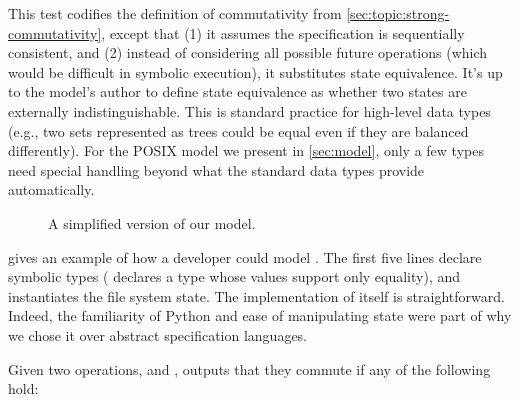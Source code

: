 This test codifies the definition of \SIM commutativity from
\cref{sec:topic:strong-commutativity},
except that (1) it assumes the specification is sequentially consistent,
and (2) instead of considering all possible future operations
(which would be difficult in symbolic execution), it substitutes state
equivalence.  It's up to the model's author to define state equivalence
as whether two states are externally indistinguishable.  This is
standard practice for high-level data types (e.g., two sets represented
as trees could be equal even if they are balanced differently).  For the
POSIX model we present in \cref{sec:model}, only a few types need special
handling beyond
what the standard data types provide automatically.

\begin{figure}
\caption{A simplified version of our  model.
}
\label{fig:rename-spec}
\end{figure}

 gives an example of how a developer could
model .  The first five lines declare symbolic
types ( declares a type whose values support only
equality), and  instantiates the file system state.  The
implementation of  itself is straightforward.  Indeed, the
familiarity of Python and ease of manipulating state were part of why we
chose it over abstract specification languages.

Given two
 operations,  and ,
\analyzer outputs that they commute if any of the following hold:

